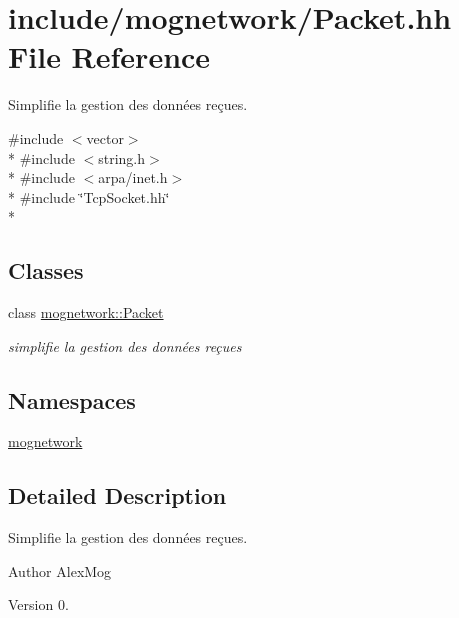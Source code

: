 \hypertarget{_packet_8hh}{\section{include/mognetwork/\-Packet.hh File Reference}
\label{_packet_8hh}
}


Simplifie la gestion des données reçues.  


{\ttfamily \#include $<$vector$>$}\\*
{\ttfamily \#include $<$string.\-h$>$}\\*
{\ttfamily \#include $<$arpa/inet.\-h$>$}\\*
{\ttfamily \#include \char`\"{}Tcp\-Socket.\-hh\char`\"{}}\\*
\subsection*{Classes}
\begin{DoxyCompactItemize}
\item 
class \hyperlink{classmognetwork_1_1_packet}{mognetwork\-::\-Packet}
\begin{DoxyCompactList}\small\item\em simplifie la gestion des données reçues \end{DoxyCompactList}\end{DoxyCompactItemize}
\subsection*{Namespaces}
\begin{DoxyCompactItemize}
\item 
\hyperlink{namespacemognetwork}{mognetwork}
\end{DoxyCompactItemize}


\subsection{Detailed Description}
Simplifie la gestion des données reçues. \begin{DoxyAuthor}{Author}
Alex\-Mog 
\end{DoxyAuthor}
\begin{DoxyVersion}{Version}
0. 
\end{DoxyVersion}

